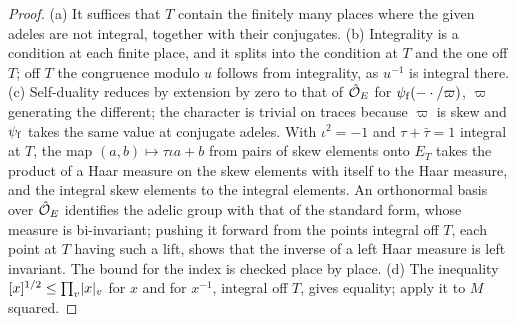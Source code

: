 \begin{proof}
(a) It suffices that $T$ contain the finitely many places where the given adeles are not integral, together with their conjugates. (b) Integrality is a condition at each finite place, and it splits into the
condition at $T$ and the one off $T$; off $T$ the congruence modulo $u$ follows from integrality, as $u^{-1}$ is integral there. (c) Self-duality reduces by extension by zero to that of $\hat{\mathcal{O}}_E$ for $\psi_{\rm f}(-\cdot/\varpi)$,
$\varpi$ generating the different; the character is trivial on traces because $\varpi$ is skew and $\psi_{\rm f}$ takes the same value at conjugate adeles. With $\iota^2=-1$ and $\tau+\bar\tau=1$ integral at $T$, the map
$(a,b)\mapsto\tau\iota a+b$ from pairs of skew elements onto $E_T$ takes the product of a Haar measure on the skew elements with itself to the Haar measure, and the integral skew elements to the integral elements.
An orthonormal basis over $\hat{\mathcal{O}}_E$ identifies the adelic group with that of the standard form, whose measure is bi-invariant; pushing it forward from the points integral off $T$, each point at $T$ having
such a lift, shows that the inverse of a left Haar measure is left invariant. The bound for the index is checked place by place. (d) The inequality $[x]^{1/2}\le\prod_v\lvert x\rvert_v$ for $x$ and for $x^{-1}$, integral off $T$,
gives equality; apply it to $M$ squared.
\end{proof}

